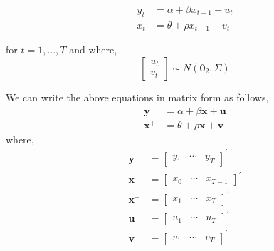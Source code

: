 \documentclass[12pt,twoside]{article}
\begin{document}
\begin{align*}
    y_t &= \alpha + \beta x_{t-1} + u_t \\
    x_t &= \theta + \rho x_{t-1} + v_t
\end{align*}

for \(t = 1, \dots, T\) and where,
\[
    \begin{bmatrix} u_t \\ v_t \end{bmatrix} \sim N(\mathbf 0_2, \Sigma)
\]

We can write the above equations in matrix form as follows,
\begin{align*}
    \mathbf{y} & = \alpha + \beta\mathbf{x} + \mathbf{u} \\ 
    \mathbf{x}^{+} & = \theta + \rho\mathbf{x} + \mathbf{v}
\end{align*}
where,
\begin{align*}
    \mathbf y & = \begin{bmatrix} y_1 & \cdots & y_T \end{bmatrix}^\prime \\
    \mathbf x & = \begin{bmatrix} x_0 & \cdots & x_{T-1} \end{bmatrix}^\prime \\
    \mathbf x^{+}  & = \begin{bmatrix} x_1 & \cdots & x_T \end{bmatrix}^\prime \\
    \mathbf u & = \begin{bmatrix} u_1 & \cdots & u_T \end{bmatrix}^\prime \\
    \mathbf v & = \begin{bmatrix} v_1 & \cdots & v_T \end{bmatrix}^\prime \\
\end{align*}
\end{document}
